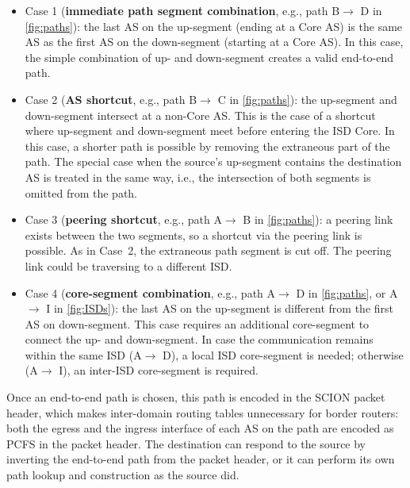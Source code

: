 \documentclass[a4paper]{llncs}
\newcommand\SCION{{\small\textsf{SCION}}\xspace}
\newcommand\A{\textsf{A}\xspace}
\newcommand\B{\textsf{B}\xspace}
\newcommand\C{\textsf{C}\xspace}
\newcommand\D{\textsf{D}\xspace}
\newcommand\I{\textsf{I}\xspace}
\begin{document}
\begin{itemize}

\item Case 1 (\textbf{immediate path segment combination},
e.g., path \B $\to$ \D in \autoref{fig:paths}):
the last AS on the up-segment (ending at a Core AS) is the same AS as
the first AS on the down-segment (starting at a Core AS). In this case,
the simple combination of up- and down-segment creates a valid
end-to-end path.


\item Case 2 (\textbf{AS shortcut},
e.g., path \B $\to$ \C in \autoref{fig:paths}):
the up-segment and down-segment intersect at a non-Core AS. This is the
case of a shortcut where up-segment and down-segment meet before
entering the ISD Core. In this case, a shorter path is possible by
removing the extraneous part of the path. The special case when the
source's up-segment contains the destination AS is treated in the same
way, i.e., the intersection of both segments is omitted from the path.

\item Case 3 (\textbf{peering shortcut},
e.g., path \A $\to$ \B in \autoref{fig:paths}):
a peering link exists between the two segments, so a shortcut via the
peering link is possible. As in Case~2, the extraneous path segment
is cut off. The peering link could be traversing to a different ISD.

\item Case 4 (\textbf{core-segment combination}, e.g., path \A $\to$
\D in \autoref{fig:paths}, or \A $\to$ \I in \autoref{fig:ISDs}): the
last AS on the up-segment is different from the first AS on
down-segment. This case requires an additional core-segment to
connect the up- and down-segment. In case the communication remains
within the same ISD (\A $\to$ \D), a local ISD core-segment is
needed; otherwise (\A $\to$ \I), an inter-ISD core-segment is
required.

\end{itemize}

Once an end-to-end path is chosen, this path is encoded in the \SCION
packet header, which makes inter-domain routing
tables unnecessary for border routers: both the egress and the
ingress interface of each AS on the path are encoded as PCFS in the
packet header. The destination can respond
to the source by inverting the end-to-end path from the packet
header, or it can perform its own path lookup and construction as the
source did.
\end{document}
